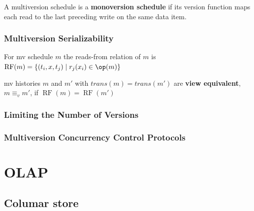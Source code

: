 \documentclass[11pt]{article}
\DeclareMathOperator{\RF}{\text{RF}}
\begin{document}
\begin{definition}[]
A multiversion schedule is a \textbf{monoversion schedule} if its version function maps each read to the
last preceding write on the same data item.
\end{definition}
\subsubsection{Multiversion Serializability}
\label{sec:org9e0ddda}
\begin{definition}[]
For mv schedule \(m\) the reads-from relation of \(m\) is \(\RF(m)=\{(t_i,x,t_j)\mid r_j(x_i)\in\op(m)\}\)
\end{definition}

\begin{definition}[]
mv histories \(m\) and \(m'\) with \(trans(m)=trans(m')\) are \textbf{view equivalent}, \(m\equiv_vm'\), if \(\RF(m)=\RF(m')\)
\end{definition}
\subsubsection{Limiting the Number of Versions}
\label{sec:org93caa66}
\subsubsection{Multiversion Concurrency Control Protocols}
\label{sec:org4a6f1a8}
\section{OLAP}
\label{sec:orgb8bd5c4}
\subsection{Columar store}
\label{sec:orgaec63fa}
\end{document}
